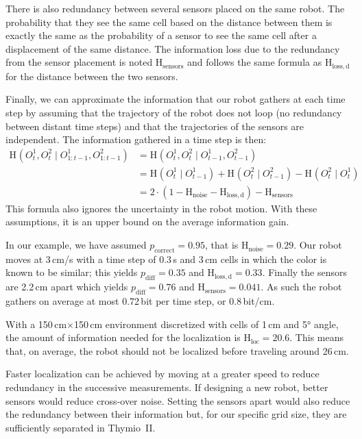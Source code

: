 \documentclass{svmult}
\newcommand{\ent}[1]{\mathrm{H}_\mathrm{#1}} %
\begin{document}
There is also redundancy between several sensors placed on the same robot.
The probability that they see the same cell based on the distance between them is exactly the same as the probability of a sensor to see the same cell after a displacement of the same distance.
The information loss due to the redundancy from the sensor placement is noted $\ent{sensors}$ and follows the same formula as $\ent{loss,d}$ for the distance between the two sensors.

Finally, we can approximate the information that our robot gathers at each time step by assuming that the trajectory of the robot does not loop (no redundancy between distant time steps) and that the trajectories of the sensors are independent. 
The information gathered in a time step is then:
\begin{equation}
\begin{split}
	\ent{}(O^1_t, O^2_t \mid O^1_{1:t-1}, O^2_{1:t-1}) &= \ent{}(O^1_t, O^2_t \mid O^1_{t-1}, O^2_{t-1}) \\
	&= \ent{}(O^1_t \mid O^1_{t-1}) + \ent{}(O^2_t \mid O^2_{t-1}) - \ent{}(O^2_t \mid O^1_t) \\
	&= 2\cdot(1-\ent{noise}-\ent{loss,d}) - \ent{sensors}%
\end{split}
\end{equation}
This formula also ignores the uncertainty in the robot motion.
With these assumptions, it is an upper bound on the average information gain.

In our example, we have assumed $p_\mathrm{correct}=0.95$, that is $\ent{noise}=0.29$.
Our robot moves at 3\,cm/s with a time step of 0.3\,s and 3\,cm cells in which the color is known to be similar; this yields $p_\mathrm{diff}=0.35$ and $\ent{loss,d}=0.33$.
Finally the sensors are 2.2\,cm apart which yields $p_\mathrm{diff}=0.76$ and $\ent{sensors}=0.041$.
As such the robot gathers on average at most 0.72\,bit per time step, or 0.8\,bit/cm.

With a 150\,cm$\times$150\,cm environment discretized with cells of 1\,cm and 5° angle, the amount of information needed for the localization is $\ent{loc}=20.6$.
This means that, on average, the robot should not be localized before traveling around 26\,cm.

Faster localization can be achieved by moving at a greater speed to reduce redundancy in the successive measurements.
If designing a new robot, better sensors would reduce cross-over noise.
Setting the sensors apart would also reduce the redundancy between their information but, for our specific grid size, they are sufficiently separated in Thymio~II.
\end{document}
